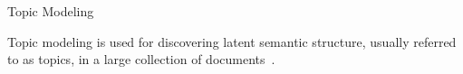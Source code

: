 \begin{frame}{Topic Modeling}
    \begin{definition}
        Topic modeling is used for discovering latent semantic structure, usually referred to as topics, in a large collection of documents~\parencite{top2vec_2020}.
    \end{definition}
\end{frame}